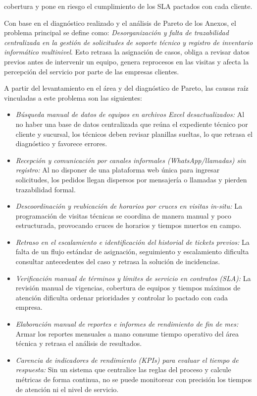 cobertura y pone en riesgo el cumplimiento de los SLA pactados con cada cliente.

Con base en el diagnóstico realizado y el análisis de Pareto de los Anexos, el problema principal se define como: \textit{Desorganización y falta de trazabilidad centralizada en la gestión de solicitudes de soporte técnico y registro de inventario informático multinivel}. Esto retrasa la asignación de casos, obliga a revisar datos previos antes de intervenir un equipo, genera reprocesos en las visitas y afecta la percepción del servicio por parte de las empresas clientes.

A partir del levantamiento en el área y del diagnóstico de Pareto, las causas raíz vinculadas a este problema son las siguientes:

\begin{itemize}
 \item \textit{Búsqueda manual de datos de equipos en archivos Excel desactualizados:} Al no haber una base de datos centralizada que reúna el expediente técnico por cliente y sucursal, los técnicos deben revisar planillas sueltas, lo que retrasa el diagnóstico y favorece errores.

 \item \textit{Recepción y comunicación por canales informales (WhatsApp/llamadas) sin registro:} Al no disponer de una plataforma web única para ingresar solicitudes, los pedidos llegan dispersos por mensajería o llamadas y pierden trazabilidad formal.

 \item \textit{Descoordinación y reubicación de horarios por cruces en visitas in-situ:} La programación de visitas técnicas se coordina de manera manual y poco estructurada, provocando cruces de horarios y tiempos muertos en campo.

 \item \textit{Retraso en el escalamiento e identificación del historial de tickets previos:} La falta de un flujo estándar de asignación, seguimiento y escalamiento dificulta consultar antecedentes del caso y retrasa la solución de incidencias.

 \item \textit{Verificación manual de términos y límites de servicio en contratos (SLA):} La revisión manual de vigencias, cobertura de equipos y tiempos máximos de atención dificulta ordenar prioridades y controlar lo pactado con cada empresa.

 \item \textit{Elaboración manual de reportes e informes de rendimiento de fin de mes:} Armar los reportes mensuales a mano consume tiempo operativo del área técnica y retrasa el análisis de resultados.

 \item \textit{Carencia de indicadores de rendimiento (KPIs) para evaluar el tiempo de respuesta:} Sin un sistema que centralice las reglas del proceso y calcule métricas de forma continua, no se puede monitorear con precisión los tiempos de atención ni el nivel de servicio.
\end{itemize}

